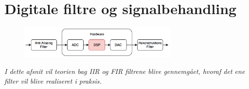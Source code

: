 \chapter{Digitale filtre og signalbehandling}\label{kap:filter}

\begin{figure}[h]
	\vspace*{-1 cm}
	\includegraphics[width=8cm]{billeder/flow_dsp}
	\vspace{0.5 cm}
\end{figure}

\emph{I dette afsnit vil teorien bag IIR og FIR filtrene blive gennemgået, hvoraf det ene filter vil blive realiseret i praksis.}